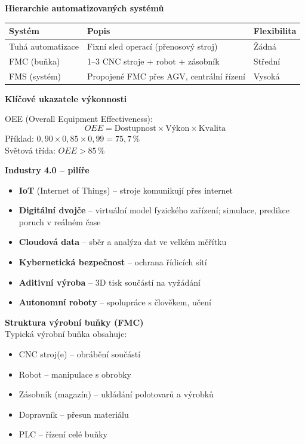 \documentclass[a4paper,10pt]{article}
\begin{document}
\begin{vysvetlenibox}
\textbf{Hierarchie automatizovaných systémů}

\begin{center}
\begin{tabularx}{0.95\linewidth}{@{} l X X @{}}
    \toprule
    \textbf{Systém} & \textbf{Popis} & \textbf{Flexibilita} \\
    \midrule
    Tuhá automatizace & Fixní sled operací (přenosový stroj) & Žádná \\
    FMC (buňka)      & 1--3 CNC stroje + robot + zásobník & Střední \\
    FMS (systém)     & Propojené FMC přes AGV, centrální řízení & Vysoká \\
    \bottomrule
\end{tabularx}
\end{center}

\textbf{Klíčové ukazatele výkonnosti}

\begin{vzorcebox}
OEE (Overall Equipment Effectiveness):
$$OEE = \text{Dostupnost} \times \text{Výkon} \times \text{Kvalita}$$
Příklad: $0{,}90 \times 0{,}85 \times 0{,}99 = 75{,}7\,\%$\\
Světová třída: $OEE > 85\,\%$
\end{vzorcebox}

\textbf{Industry 4.0 -- pilíře}
\begin{itemize}[noitemsep, leftmargin=1.4em, topsep=4pt]
    \item \textbf{IoT} (Internet of Things) -- stroje komunikují přes internet
    \item \textbf{Digitální dvojče} -- virtuální model fyzického zařízení;
          simulace, predikce poruch v reálném čase
    \item \textbf{Cloudová data} -- sběr a analýza dat ve velkém měřítku
    \item \textbf{Kybernetická bezpečnost} -- ochrana řídicích sítí
    \item \textbf{Aditivní výroba} -- 3D tisk součástí na vyžádání
    \item \textbf{Autonomní roboty} -- spolupráce s člověkem, učení
\end{itemize}

\textbf{Struktura výrobní buňky (FMC)}\\
Typická výrobní buňka obsahuje:
\begin{itemize}[noitemsep, leftmargin=1.4em, topsep=4pt]
    \item CNC stroj(e) -- obrábění součástí
    \item Robot -- manipulace s obrobky
    \item Zásobník (magazín) -- ukládání polotovarů a výrobků
    \item Dopravník -- přesun materiálu
    \item PLC -- řízení celé buňky
\end{itemize}


\end{vysvetlenibox}
\end{document}
